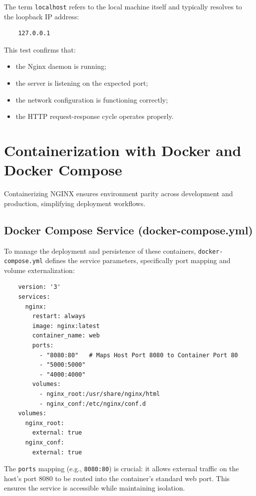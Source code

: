 \documentclass{scrbook}
\begin{document}
	The term \texttt{localhost} refers to the local machine itself and typically resolves to the loopback IP address:
	
	\begin{verbatim}
	127.0.0.1
	\end{verbatim}
	
	This test confirms that:
	\begin{itemize}
		\item the Nginx daemon is running;
		\item the server is listening on the expected port;
		\item the network configuration is functioning correctly;
		\item the HTTP request-response cycle operates properly.
	\end{itemize}
	
	\chapter{Containerization with Docker and Docker Compose}
	
	Containerizing NGINX ensures environment parity across development and production, simplifying deployment workflows.
	
	\section{Docker Compose Service (docker-compose.yml)}
	
	To manage the deployment and persistence of these containers, \texttt{docker-compose.yml} defines the service parameters, specifically port mapping and volume externalization:
	
	\begin{lstlisting}
	version: '3'
	services:
	  nginx:
		restart: always
		image: nginx:latest
		container_name: web
		ports:
		  - "8080:80"   # Maps Host Port 8080 to Container Port 80
		  - "5000:5000"
		  - "4000:4000"
		volumes:
		  - nginx_root:/usr/share/nginx/html
		  - nginx_conf:/etc/nginx/conf.d
	volumes:
	  nginx_root:
		external: true
	  nginx_conf:
		external: true
	\end{lstlisting}
	
	The \texttt{ports} mapping (e.g., \texttt{8080:80}) is crucial: it allows external traffic on the host's port 8080 to be routed into the container's standard web port. This ensures the service is accessible while maintaining isolation.\\
	
\end{document}
